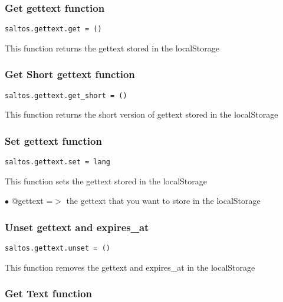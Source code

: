 \documentclass[a4paper]{article}
\begin{document}
\hypertarget{toc795}{}
\subsubsection{Get gettext function}

\begin{lstlisting}
saltos.gettext.get = ()
\end{lstlisting}

This function returns the gettext stored in the localStorage

\hypertarget{toc796}{}
\subsubsection{Get Short gettext function}

\begin{lstlisting}
saltos.gettext.get_short = ()
\end{lstlisting}

This function returns the short version of gettext stored in the localStorage

\hypertarget{toc797}{}
\subsubsection{Set gettext function}

\begin{lstlisting}
saltos.gettext.set = lang
\end{lstlisting}

This function sets the gettext stored in the localStorage

\begin{compactitem}
\item[\color{myblue}$\bullet$] @gettext      =$>$ the gettext that you want to store in the localStorage
\end{compactitem}

\hypertarget{toc798}{}
\subsubsection{Unset gettext and expires\_at}

\begin{lstlisting}
saltos.gettext.unset = ()
\end{lstlisting}

This function removes the gettext and expires\_at in the localStorage

\hypertarget{toc799}{}
\subsubsection{Get Text function}
\end{document}
